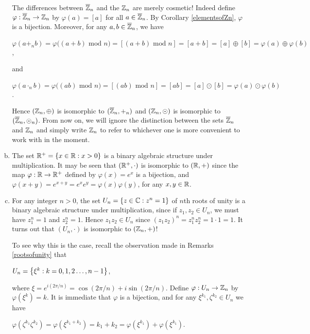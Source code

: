 \documentclass[11pt,fleqn,dvipsnames,usenames]{article}
\newcommand{\p}{\noindent}
\begin{document}
\begin{examples}
\begin{enumerate}[(a)]
\p The differences between $\overline{\mathbb{Z}}_{n}$ and the $\mathbb{Z}_{n}$ are merely cosmetic!  Indeed define $\varphi:\overline{\mathbb{Z}}_{n}\to \mathbb{Z}_{n}$ by $\varphi(a) = [a]$ for all $a \in \overline{\mathbb{Z}}_{n}$.  By Corollary \ref{elementsofZn}, $\varphi$ is a bijection.  Moreover, for any $a,b\in\overline{\mathbb{Z}}_{n}$, we have 
\begin{center}
$\varphi(a+_nb) = \varphi\big((a+b)\text{ mod }n\big) = [(a+b)\text{ mod }n] = [a+b] = [a]\oplus [b] = \varphi(a)\oplus\varphi(b)$,
\end{center}
and
\begin{center}
$\varphi(a\cdot_nb) = \varphi\big((ab)\text{ mod }n\big) = [(ab)\text{ mod }n] = [ab] = [a]\odot [b] = \varphi(a)\odot\varphi(b)$.
\end{center}
%
\p Hence $(\mathbb{Z}_{n},\oplus)$ is isomorphic to $(\overline{\mathbb{Z}}_n,+_n)$ and $(\mathbb{Z}_{n},\odot)$ is isomorphic to $(\overline{\mathbb{Z}}_n,\odot_n)$.  From now on, we will ignore the distinction between the sets $\overline{\mathbb{Z}}_n$ and $\mathbb{Z}_{n}$ and simply write $\mathbb{Z}_{n}$ to refer to whichever one is more convenient to work with in the moment.
%
\item The set $\mathbb{R}^{+} = \left\{x\in\mathbb{R}:x>0\right\}$ is a binary algebraic structure under multiplication.  It may be seen that $(\mathbb{R}^{+},\cdot)$ is isomorphic to $(\mathbb{R}, +)$ since the map $\varphi:\mathbb{R}\to\mathbb{R}^{+}$ defined by $\varphi(x) = e^{x}$ is a bijection, and $\varphi(x+y) = e^{x + y} = e^xe^{y} = \varphi(x)\varphi(y)$, for any $x,y\in\mathbb{R}$.
%
\item For any integer $n>0$, the set $U_{n} = \left\{z\in\mathbb{C}:z^n = 1\right\}$ of $n$th roots of unity is a binary algebraic structure under multiplication, since if $z_{1},z_{2}\in U_{n}$, we must have $z_{1}^n = 1$ and $z_{2}^n = 1$.  Hence $z_{1}z_{2}\in U_n$ since $(z_{1}z_{2})^n = z_{1}^nz_{2}^n = 1\cdot 1 = 1$.  It turns out that $(U_{n},\cdot)$ is isomorphic to $(\mathbb{Z}_{n},+)$!
\vsp

\p To see why this is the case, recall the observation made in Remarks \ref{rootsofunity} that
\begin{center}
$U_{n} = \left\{\xi^{k}:k=0,1,2\ldots, n-1\right\}$,
\end{center}
where $\xi = e^{i(2\pi/n)} = \cos(2\pi/n) + i\sin(2\pi/n)$.  Define $\varphi:U_{n}\to\mathbb{Z}_{n}$ by $\varphi(\xi^k) = k$.  It is immediate that $\varphi$ is a bijection, and for any $\xi^{k_1},\zeta^{k_2}\in U_n$ we have
\begin{center}
$\varphi(\zeta^{k_1}\zeta^{k_2}) = \varphi(\xi^{k_1+k_2}) = k_1+k_2 = \varphi(\xi^{k_1}) + \varphi(\xi^{k_1})$.
\end{center}
\end{enumerate}
\end{examples}
\end{document}
